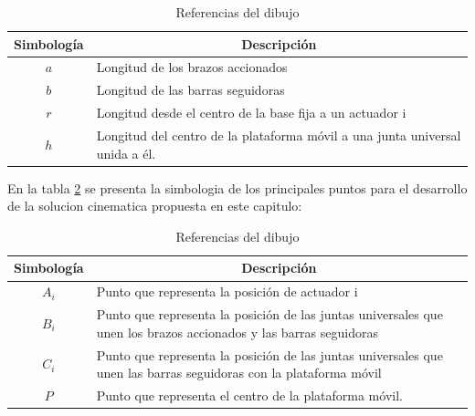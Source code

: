         \begingroup
            \renewcommand{\arraystretch}{1.5}
            \begin{table}[H]
            \centering
            \begin{tabular}{c m{12cm}}
               \hline
               \textbf{Simbología}  & \multicolumn{1}{c}{\textbf{Descripción}}  \\
               \hline           \hline            
             $a$ & Longitud de los brazos accionados \\
            \hline
             $b$ & Longitud de las barras seguidoras \\
            \hline
             $r$ & Longitud desde el centro de la base fija a un actuador i \\
            \hline
             $h$ & Longitud del centro de la plataforma móvil a una junta universal unida a él.\\
            \hline
            \end{tabular}
            \caption{Referencias del dibujo}
           \label{tab:cap4_tabla_6}
        \end{table}
        \endgroup        

    En la tabla \ref{tab:cap4_tabla_7} se presenta la simbologia de los principales puntos para el desarrollo de la solucion cinematica propuesta en este capitulo: 
    
        \begingroup
            \renewcommand{\arraystretch}{1.5}
            \begin{table}[H]
            \centering
            \begin{tabular}{c m{12cm}}
               \hline
               \textbf{Simbología}  & \multicolumn{1}{c}{\textbf{Descripción}}  \\\hline
            \hline            
             $A_{i}$ & Punto que representa la posición de actuador i \\
            \hline
             $ B_{i}$ & Punto que representa la posición de las juntas universales que unen los brazos accionados y las barras seguidoras \\
            \hline
             $C_{i}$ & Punto que representa la posición de las juntas universales que unen las barras seguidoras con la plataforma móvil \\
            \hline
             $P$ & Punto que representa el centro de la plataforma móvil.\\
            \hline
            \end{tabular}
            \caption{Referencias del dibujo}
           \label{tab:cap4_tabla_7}
        \end{table}
        \endgroup
    

